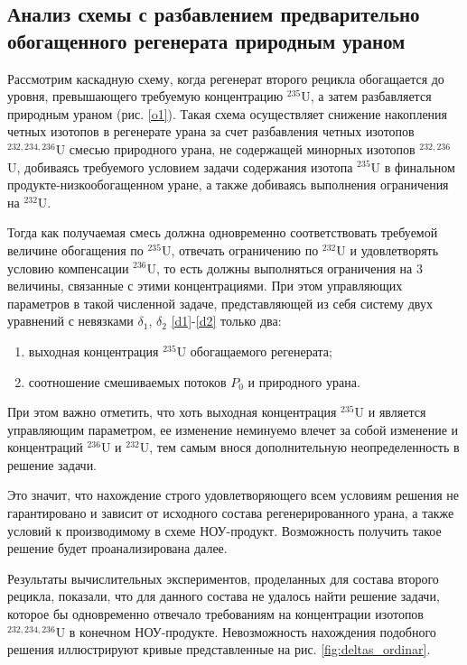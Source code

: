 \subsection{Анализ схемы с разбавлением предварительно обогащенного регенерата природным ураном}

Рассмотрим каскадную схему, когда регенерат второго рецикла обогащается до уровня, превышающего требуемую концентрацию $^{235}$U, а затем разбавляется природным ураном (рис. \ref{o1}). Такая схема осуществляет снижение накопления четных изотопов в регенерате урана за счет разбавления четных изотопов $^{232,234,236}$U смесью природного урана, не содержащей минорных изотопов $^{232,236}$U, добиваясь требуемого условием задачи содержания изотопа $^{235}$U в финальном продукте-низкообогащенном уране, а также добиваясь выполнения ограничения на  $^{232}$U.

Тогда как получаемая смесь должна одновременно соответствовать требуемой величине обогащения по $^{235}$U, отвечать ограничению по $^{232}$U и удовлетворять условию компенсации $^{236}$U, то есть должны выполняться ограничения на 3 величины, связанные с этими концентрациями. При этом управляющих параметров в такой численной задаче, представляющей из себя систему двух уравнений с невязками $\delta_1$, $\delta_2$ \ref{d1}-\ref{d2} только два:

\begin{enumerate}
  \item выходная концентрация $^{235}$U обогащаемого регенерата;
  \item соотношение смешиваемых потоков $P_0$ и природного урана.
\end{enumerate}

При этом важно отметить, что хоть выходная концентрация $^{235}$U и является управляющим параметром, ее изменение неминуемо влечет за собой изменение и концентраций $^{236}$U и $^{232}$U, тем самым внося дополнительную неопределенность в решение задачи.

Это значит, что нахождение строго удовлетворяющего всем условиям решения не гарантировано и зависит от исходного состава регенерированного урана, а также условий к производимому в схеме НОУ-продукт. Возможность получить такое решение будет проанализирована далее.   

Результаты вычислительных экспериментов, проделанных для состава второго рецикла, показали, что для данного состава не удалось найти решение задачи, которое бы одновременно отвечало требованиям на концентрации изотопов $^{232,234,236}$U в конечном НОУ-продукте. Невозможность нахождения подобного решения иллюстрируют кривые представленные на рис. \ref{fig:deltas_ordinar}.

